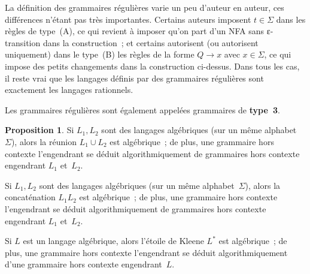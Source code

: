 \documentclass[12pt,a4paper]{article}
\theoremstyle{definition}
\newtheorem{prop}[comcnt]{Proposition}
\begin{document}
{\footnotesize La définition des grammaires régulières varie un peu
  d'auteur en auteur, ces différences n'étant pas très importantes.
  Certains auteurs imposent $t \in \Sigma$ dans les règles de
  type (A), ce qui revient à imposer qu'on part d'un NFA sans
  ε-transition dans la construction ; et certains autorisent (ou
  autorisent uniquement) dans le type (B) les règles de la forme $Q
  \rightarrow x$ avec $x\in\Sigma$, ce qui impose des petits
  changements dans la construction ci-dessus.  Dans tous les cas, il
  reste vrai que les langages définis par des grammaires régulières
  sont exactement les langages rationnels.\par}

Les grammaires régulières sont également appelées grammaires de
\textbf{type 3}.

\begin{prop}\label{cfg-union-concatenation-and-star}
Si $L_1,L_2$ sont des langages algébriques (sur un même
alphabet $\Sigma$), alors la réunion $L_1
\cup L_2$ est algébrique ; de plus, une grammaire hors contexte
l'engendrant se déduit algorithmiquement de grammaires hors contexte
engendrant $L_1$ et $L_2$.

Si $L_1,L_2$ sont des langages algébriques (sur un même
alphabet $\Sigma$), alors la concaténation $L_1 L_2$ est algébrique ; de plus, une
grammaire hors contexte l'engendrant se déduit algorithmiquement de
grammaires hors contexte engendrant $L_1$ et $L_2$.

Si $L$ est un langage algébrique, alors l'étoile de Kleene $L^*$ est algébrique ; de plus, une
grammaire hors contexte l'engendrant se déduit algorithmiquement d'une
grammaire hors contexte engendrant $L$.
\end{prop}
\end{document}
